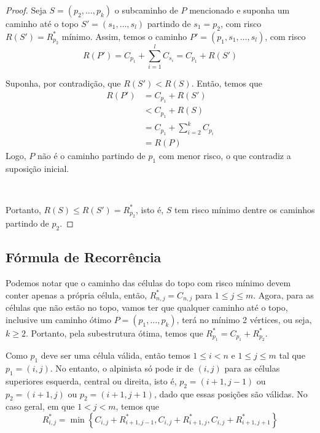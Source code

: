 \begin{proof}
    Seja $S = \left(p_2, \ldots, p_k\right)$ o subcaminho de $P$ mencionado e suponha um caminho até o topo $S' = \left(s_1, \ldots, s_l\right)$ partindo de $s_1 = p_2$, com risco $R(S') = R^*_{p_2}$ mínimo. Assim, temos o caminho $P' = \left(p_1, s_1, \ldots, s_l\right)$, com risco
    \[
        R(P') = C_{p_1} + \sum_{i = 1}^l C_{s_i} = C_{p_1} + R(S')
    \]

    Suponha, por contradição, que $R(S') < R(S)$. Então, temos que
    \begin{align*}
        R(P') &= C_{p_1} + R(S')  \\
            &< C_{p_1} + R(S) \\
            &= C_{p_1} + \sum_{i = 2}^{k} C_{p_i} \\
            &= R(P)
    \end{align*}
    Logo, $P$ não é o caminho partindo de $p_1$ com menor risco, o que contradiz a suposição inicial.

    ~

    Portanto, $R(S) \leq R(S') = R^*_{p_2}$, isto é, $S$ tem risco mínimo dentre os caminhos partindo de $p_2$.
\end{proof}

\begin{samepage}
    \subsection{Fórmula de Recorrência} \label{sec:formrec}
\end{samepage}

Podemos notar que o caminho das células do topo com risco mínimo devem conter apenas a própria célula, então, $R^*_{n, j} = C_{n, j}$  para $1 \leq j \leq m$. Agora, para as células que não estão no topo, vamos ter que qualquer caminho até o topo, inclusive um caminho ótimo $P = \left(p_1, \ldots, p_k\right)$, terá no mínimo 2 vértices, ou seja, $k \geq 2$. Portanto, pela subestrutura ótima, temos que $R^*_{p_1} = C_{p_1} + R^*_{p_2}$.

Como $p_1$ deve ser uma célula válida, então temos $1 \leq i < n$ e $1 \leq j \leq m$ tal que $p_1 = (i, j)$. No entanto, o alpinista só pode ir de $(i, j)$ para as células superiores esquerda, central ou direita, isto é, $p_2 = (i+1, j-1)$ ou $p_2 = (i+1, j)$ ou $p_2 = (i+1, j+1)$, dado que essas posições são válidas. No caso geral, em que $1 < j < m$, temos que
\[
    R^*_{i, j} = \min\left\{C_{i, j} + R^*_{i+1,j-1}, C_{i, j} + R^*_{i+1,j}, C_{i, j} + R^*_{i+1,j+1}\right\}
\]

